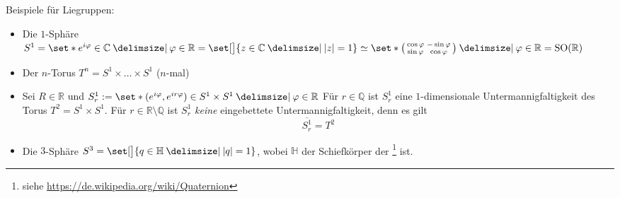 Beispiele für Liegruppen: 
\begin{itemize}
	\item Die $1$-Sphäre $S^1 = \set*{e^{i \varphi} \in \mathbb{C} \given \varphi \in \mathbb{R}} = \set[\big]{z \in \mathbb{C} \given \abs*{z}=1} \simeq \set*{\begin{psmallmatrix}
		\cos \varphi & - \sin \varphi \\
		\sin \varphi & \cos \varphi
	\end{psmallmatrix} \given \varphi \in \mathbb{R}} = \SO(\mathbb{R})$
	\item Der $n$-Torus $T^n = S^1 \times \ldots \times S^1 $ ($n$-mal)
	\item Sei $R \in \mathbb{R}$ und $S^1_r := \set*{\enbrace{e^{i \varphi}, e^{i r \varphi}} \in S^1 \times S^1 \given \varphi \in \mathbb{R}}$
	Für $r \in \mathbb{Q}$ ist $S^1_r$ eine $1$-dimensionale Untermannigfaltigkeit des Torus $T^2= S^1 \times S^1$.
	Für $r \in \mathbb{R} \setminus \mathbb{Q}$ ist $S^1_r$ \emph{keine} eingebettete Untermannigfaltigkeit, denn es gilt 
	\[
		\overline{S^1_r} = T^2
	\]
	\item Die $3$-Sphäre $S^3 = \set[\big]{q \in \mathbb{H} \given \abs*{q}=1}$, wobei $\mathbb{H}$ der Schiefkörper der \footnote{siehe \url{https://de.wikipedia.org/wiki/Quaternion}} ist.
	

\end{itemize}
